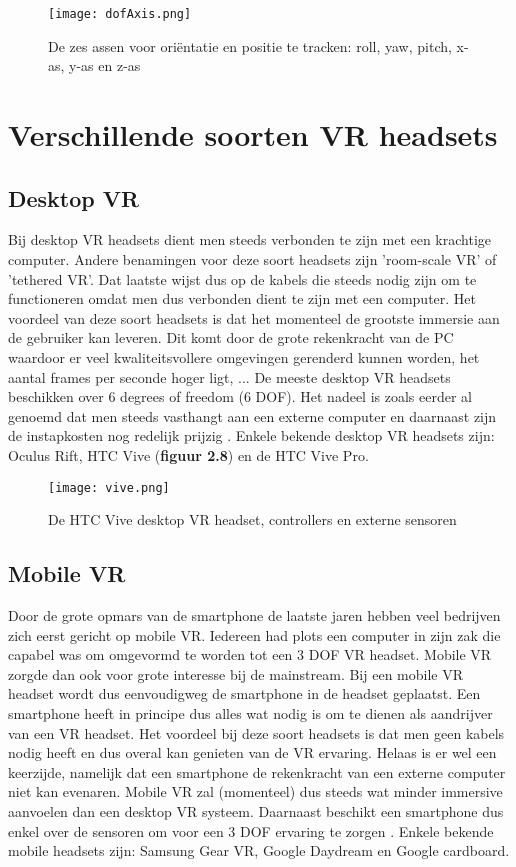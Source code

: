 \begin{figure}[h]
    \centering
    \texttt{[image: dofAxis.png]}
    \caption{De zes assen voor oriëntatie en positie te tracken: roll, yaw, pitch, x-as, y-as en z-as \autocite{Weis2018}}
\end{figure}

\pagebreak

\section{Verschillende soorten VR headsets}

\subsection{Desktop VR}
Bij desktop VR headsets dient men steeds verbonden te zijn met een krachtige computer. Andere benamingen voor deze soort headsets zijn 'room-scale VR' of 'tethered VR'. Dat laatste wijst dus op de kabels die steeds nodig zijn om te functioneren omdat men dus verbonden dient te zijn met een computer. Het voordeel van deze soort headsets is dat het momenteel de grootste immersie aan de gebruiker kan leveren. Dit komt door de grote rekenkracht van de PC waardoor er veel kwaliteitsvollere omgevingen gerenderd kunnen worden, het aantal frames per seconde hoger ligt, ... De meeste desktop VR headsets beschikken over 6 degrees of freedom (6 DOF). Het nadeel is zoals eerder al genoemd dat men steeds vasthangt aan een externe computer en daarnaast zijn de instapkosten nog redelijk prijzig \autocite{Cherdo2018}. Enkele bekende desktop VR headsets zijn: Oculus Rift, HTC Vive (\textbf{figuur 2.8}) en de HTC Vive Pro.

\begin{figure}[h]
    \centering
    \texttt{[image: vive.png]}
    \caption{De HTC Vive desktop VR headset, controllers en externe sensoren \autocite{Vive2019}}
\end{figure}


\subsection{Mobile VR}
Door de grote opmars van de smartphone de laatste jaren hebben veel bedrijven zich eerst gericht op mobile VR. Iedereen had plots een computer in zijn zak die capabel was om omgevormd te worden tot een 3 DOF VR headset. Mobile VR zorgde dan ook voor grote interesse bij de mainstream. Bij een mobile VR headset wordt dus eenvoudigweg de smartphone in de headset geplaatst.
Een smartphone heeft in principe dus alles wat nodig is om te dienen als aandrijver van een VR headset. Het voordeel bij deze soort headsets is dat men geen kabels nodig heeft en dus overal kan genieten van de VR ervaring. Helaas is er wel een keerzijde, namelijk dat een smartphone de rekenkracht van een externe computer niet kan evenaren. Mobile VR zal (momenteel) dus steeds wat minder immersive aanvoelen dan een desktop VR systeem. Daarnaast beschikt een smartphone dus enkel over de sensoren om voor een 3 DOF ervaring te zorgen \autocite{Cherdo2018}.
Enkele bekende mobile headsets zijn: Samsung Gear VR, Google Daydream en Google cardboard.

